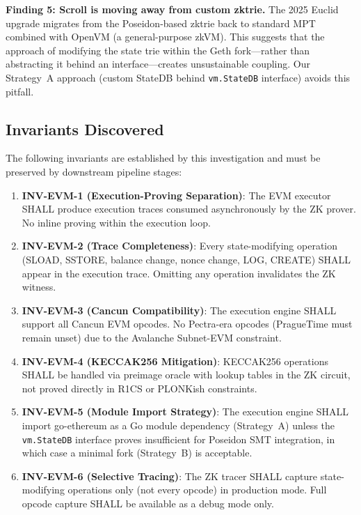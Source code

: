 \textbf{Finding 5: Scroll is moving away from custom zktrie.}
The 2025 Euclid upgrade migrates from the Poseidon-based zktrie back to
standard MPT combined with OpenVM (a general-purpose zkVM). This suggests
that the approach of modifying the state trie within the Geth fork---rather
than abstracting it behind an interface---creates unsustainable coupling.
Our Strategy~A approach (custom StateDB behind \texttt{vm.StateDB} interface)
avoids this pitfall.

\subsection{Invariants Discovered}

The following invariants are established by this investigation and must be
preserved by downstream pipeline stages:

\begin{enumerate}
  \item \textbf{INV-EVM-1 (Execution-Proving Separation)}: The EVM executor
    SHALL produce execution traces consumed asynchronously by the ZK prover.
    No inline proving within the execution loop.

  \item \textbf{INV-EVM-2 (Trace Completeness)}: Every state-modifying operation
    (SLOAD, SSTORE, balance change, nonce change, LOG, CREATE) SHALL appear in
    the execution trace. Omitting any operation invalidates the ZK witness.

  \item \textbf{INV-EVM-3 (Cancun Compatibility)}: The execution engine SHALL
    support all Cancun EVM opcodes. No Pectra-era opcodes (PragueTime must
    remain unset) due to the Avalanche Subnet-EVM constraint.

  \item \textbf{INV-EVM-4 (KECCAK256 Mitigation)}: KECCAK256 operations SHALL
    be handled via preimage oracle with lookup tables in the ZK circuit,
    not proved directly in R1CS or PLONKish constraints.

  \item \textbf{INV-EVM-5 (Module Import Strategy)}: The execution engine
    SHALL import go-ethereum as a Go module dependency (Strategy~A) unless
    the \texttt{vm.StateDB} interface proves insufficient for Poseidon SMT
    integration, in which case a minimal fork (Strategy~B) is acceptable.

  \item \textbf{INV-EVM-6 (Selective Tracing)}: The ZK tracer SHALL capture
    state-modifying operations only (not every opcode) in production mode.
    Full opcode capture SHALL be available as a debug mode only.
\end{enumerate}

